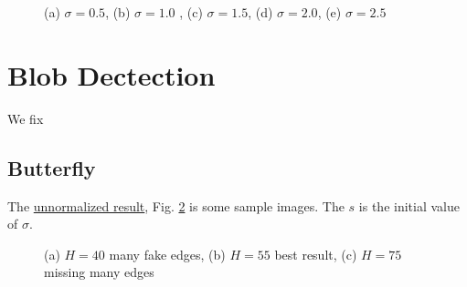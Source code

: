 \documentclass[final]{cvpr}
\begin{document}
\begin{appendices}
\begin{figure}[htbp]
{  }
  \quad
  \caption{(a) $\sigma=0.5$, (b) $\sigma=1.0$ , (c) $\sigma=1.5$, (d) $\sigma=2.0$, (e) $\sigma=2.5$}
  \label{fig: logsig}
  \end{figure}

\section{Blob Dectection}\label{sec: allblob}
We fix 

\subsection{Butterfly}
The \href{https://github.com/Arctic-Xiangjian/assignment2/tree/main/unnormalized}{unnormalized result}, Fig. \ref{fig: unnormalizedbut} is some sample images. The $s$ is the initial value of $\sigma$.
\begin{figure}[htbp]
  \centering
  \quad
  \quad
  \quad
  \caption{(a) $H=40$ many fake edges, (b) $H=55$ best result, (c) $H=75$ missing many edges}
  \label{fig: unnormalizedbut}
  \end{figure}



\end{appendices}
\end{document}
